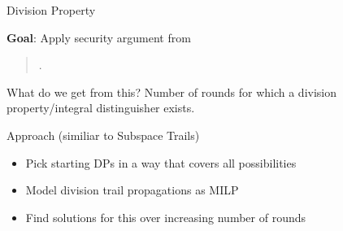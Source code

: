 \begin{frame}{Division Property}
    \begin{block}{\textbf{Goal}: Apply security argument from}
    \begin{quote}
        .
    \end{quote}
    \end{block}
    \begin{exampleblock}{What do we get from this?}
        \centering
        Number of rounds for which a division property/integral distinguisher exists.
    \end{exampleblock}
    \begin{block}{Approach (similiar to Subspace Trails)}
        \begin{itemize}
            \item Pick starting DPs in a way that covers all possibilities
            \item Model division trail propagations as MILP
            \item Find solutions for this over increasing number of rounds
        \end{itemize}
    \end{block}
\end{frame}

